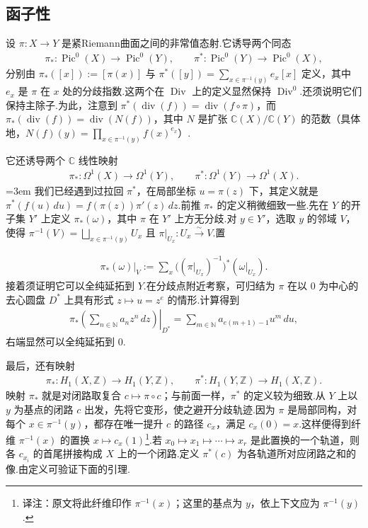 \subsection{函子性}\label{sec:modular-2-2-2}

设 $\pi:X\longrightarrow Y$ 是紧Riemann曲面之间的非常值态射.它诱导两个同态
\begin{align*}
\pi_*:\operatorname{Pic}^0(X)\longrightarrow\operatorname{Pic}^0(Y),\qquad
\pi^*:\operatorname{Pic}^0(Y)\longrightarrow\operatorname{Pic}^0(X),
\end{align*}
分别由 $\pi_*([x]):=[\pi(x)]$ 与 $\pi^*([y])=\sum_{x\in\pi^{-1}(y)}e_x[x]$ 定义，其中 $e_x$ 是 $\pi$ 在 $x$ 处的分歧指数.这两个在 $\operatorname{Div}$ 上的定义显然保持 $\operatorname{Div}^0$.还须说明它们保持主除子.为此，注意到 $\pi^*(\operatorname{div}(f))=\operatorname{div}(f\circ\pi)$，而 $\pi_*(\operatorname{div}(f))=\operatorname{div}(N(f))$，其中 $N$ 是扩张 $\mathbb C(X)/\mathbb C(Y)$ 的范数（具体地，$N(f)(y)=\prod_{x\in\pi^{-1}(y)}f(x)^{e_x}$）.



它还诱导两个 $\mathbb C$ 线性映射
\begin{align*}
\pi_*:\Omega^1(X)\longrightarrow\Omega^1(Y),\qquad
\pi^*:\Omega^1(Y)\longrightarrow\Omega^1(X).
\end{align*}
\begingroup\emergencystretch=3em
我们已经遇到过拉回 $\pi^*$，在局部坐标 $u=\pi(z)$ 下，其定义就是 $\pi^*(f(u)\,du)=f(\pi(z))\pi'(z)\,dz$.前推 $\pi_*$ 的定义稍微细致一些.先在 $Y$ 的开子集 $Y'$ 上定义 $\pi_*(\omega)$，其中 $\pi$ 在 $Y'$ 上方无分歧.对 $y\in Y'$，选取 $y$ 的邻域 $V$，使得 $\pi^{-1}(V)=\bigsqcup_{x\in\pi^{-1}(y)}U_x$ 且 $\pi|_{U_x}:U_x\xrightarrow{\sim}V$.置
\par\endgroup
\begin{align*}
\pi_*(\omega)|_V:=\sum_x\bigl((\pi|_{U_x})^{-1}\bigr)^*(\omega|_{U_x}).
\end{align*}
接着须证明它可以全纯延拓到 $Y$.在分歧点附近考察，可归结为 $\pi$ 在以 $0$ 为中心的去心圆盘 $D^*$ 上具有形式 $z\mapsto u=z^e$ 的情形.计算得到
\begin{align*}
\left.\pi_*\left(\sum_{n\in\mathbb N}a_nz^n\,dz\right)\right|_{D^*}
=\sum_{m\in\mathbb N}a_{e(m+1)-1}u^m\,du,
\end{align*}
右端显然可以全纯延拓到 $0$.



最后，还有映射
\begin{align*}
\pi_*:H_1(X,\mathbb Z)\longrightarrow H_1(Y,\mathbb Z),\qquad
\pi^*:H_1(Y,\mathbb Z)\longrightarrow H_1(X,\mathbb Z).
\end{align*}
映射 $\pi_*$ 就是对闭路取复合 $c\mapsto\pi\circ c$；与前面一样，$\pi^*$ 的定义较为细致.从 $Y$ 上以 $y$ 为基点的闭路 $c$ 出发，先将它变形，使之避开分歧轨迹.因为 $\pi$ 是局部同构，对每个 $x\in\pi^{-1}(y)$，都存在唯一提升 $c$ 的路径 $c_x$，满足 $c_x(0)=x$.这样便得到纤维 $\pi^{-1}(x)$ 的置换 $x\mapsto c_x(1)$\footnote{译注：原文将此纤维印作 $\pi^{-1}(x)$；这里的基点为 $y$，依上下文应为 $\pi^{-1}(y)$.}.若 $x_0\mapsto x_1\mapsto\cdots\mapsto x_r$ 是此置换的一个轨道，则各 $c_{x_i}$ 的首尾拼接构成 $X$ 上的一个闭路.定义 $\pi^*(c)$ 为各轨道所对应闭路之和的像.由定义可验证下面的引理.

